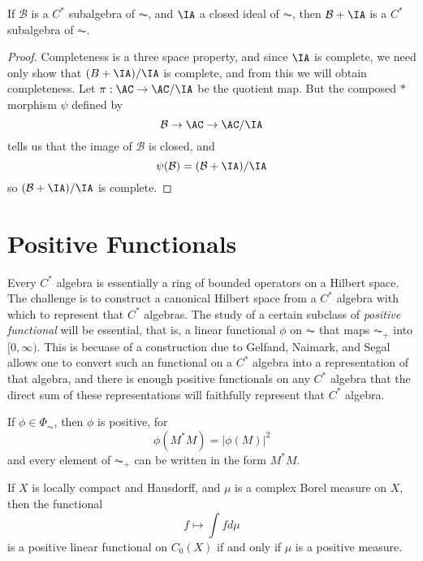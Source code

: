 \begin{prop}
    If $\mathcal{B}$ is a $C^*$ subalgebra of $\AC$, and $\IA$ a closed ideal of $\AC$, then $\mathcal{B} + \IA$ is a $C^*$ subalgebra of $\AC$.
\end{prop}
\begin{proof}
    Completeness is a three space property, and since $\IA$ is complete, we need only show that $(B + \IA)/\IA$ is complete, and from this we will obtain completeness. Let $\pi: \AC \to \AC/\IA$ be the quotient map. But the composed $*$ morphism $\psi$ defined by
    \[ \mathcal{B} \to \AC \to \AC/\IA \]
    tells us that the image of $\mathcal{B}$ is closed, and
    \[ \psi(\mathcal{B}) = (\mathcal{B} + \IA)/\IA \]
    so $(\mathcal{B} + \IA)/\IA$ is complete.
\end{proof}




\section{Positive Functionals}

Every $C^*$ algebra is essentially a ring of bounded operators on a Hilbert space. The challenge is to construct a canonical Hilbert space from a $C^*$ algebra with which to represent that $C^*$ algebras. The study of a certain subclass of \emph{positive functional} will be essential, that is, a linear functional $\phi$ on $\AC$ that maps $\AC_+$ into $[0,\infty)$. This is becuase of a construction due to Gelfand, Naimark, and Segal allows one to convert such an functional on a $C^*$ algebra into a representation of that algebra, and there is enough positive functionals on any $C^*$ algebra that the direct sum of these representations will faithfully represent that $C^*$ algebra.

\begin{example}
    If $\phi \in \Phi_{\AC}$, then $\phi$ is positive, for
    \[ \phi(M^*M) = |\phi(M)|^2 \]
    and every element of $\AC_+$ can be written in the form $M^*M$.
\end{example}

\begin{example}
    If $X$ is locally compact and Hausdorff, and $\mu$ is a complex Borel measure on $X$, then the functional
    \[ f \mapsto \int f d\mu \]
    is a positive linear functional on $C_0(X)$ if and only if $\mu$ is a positive measure.
\end{example}

